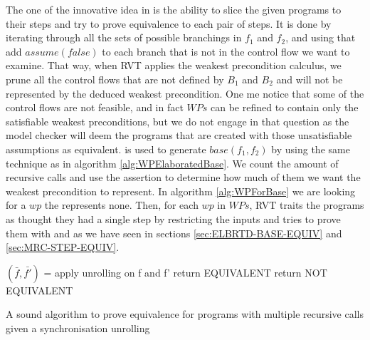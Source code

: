 The one of the innovative idea in  is the ability to slice the given programs to their steps and try to prove equivalence to each pair of steps. It is done by iterating through all the sets of possible branchings in $f_1$ and $f_2$, and using  that add $assume(false)$ to each branch that is not in the control flow we want to examine. That way, when RVT applies the weakest precondition calculus, we prune all the control flows that are not defined by $B_1$ and $B_2$ and  will not be represented by the deduced weakest precondition. One me notice that some of the control flows are not feasible, and in fact $WPs$ can be refined to contain only the satisfiable weakest preconditions, but we do not engage in that question as the model checker will deem the programs that are created with those unsatisfiable assumptions as equivalent.   
 is used to generate $base(f_1,f_2)$ by using the same technique as in algorithm \ref{alg:WPElaboratedBase}. We count the amount of recursive calls and use the assertion to determine how much of them we want the weakest precondition to represent. In algorithm \ref{alg:WPForBase} we are looking for a $wp$ the represents none. 
Then, for each $wp$ in $WPs$, RVT traits the programs as thought they had a single step by restricting the inputs and tries to prove them with  and  as we have seen in sections \ref{sec:ELBRTD-BASE-EQUIV} and \ref{sec:MRC-STEP-EQUIV}.
\iffalse
\noindent
\begin{algorithm}
\begin{minipage}{\linewidth}
\begin{algorithmic}[1]
	\State$(\bar{f},\bar{f'})$ = apply unrolling on f and f'
	\State	return EQUIVALENT
	\Else
	\State	return NOT EQUIVALENT
		\EndIf
	\EndFunction
\end{algorithmic}
\end{minipage}
\caption{A sound algorithm to prove equivalence for programs with multiple recursive calls given a synchronisation unrolling}
\label{alg:ProveWithUnrolling}
\end{algorithm}
   
